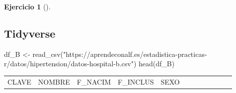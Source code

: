 \documentclass[
  a4paper,
]{scrreport}
\newenvironment{Shaded}{\begin{snugshade}}{\end{snugshade}}
\newcommand{\FunctionTok}[1]{\textcolor[rgb]{0.28,0.35,0.67}{#1}}
\newcommand{\NormalTok}[1]{\textcolor[rgb]{0.00,0.23,0.31}{#1}}
\newcommand{\OtherTok}[1]{\textcolor[rgb]{0.00,0.23,0.31}{#1}}
\newcommand{\StringTok}[1]{\textcolor[rgb]{0.13,0.47,0.30}{#1}}
\theoremstyle{definition}
\newtheorem{exercise}{Ejercicio}[chapter]
\theoremstyle{remark}
\begin{document}
\begin{exercise}[]
\begin{enumerate}
\begin{tcolorbox}
  \section{Tidyverse}

\begin{Shaded}
\begin{Highlighting}[]
\NormalTok{df\_B }\OtherTok{\textless{}{-}} \FunctionTok{read\_csv}\NormalTok{(}\StringTok{"https://aprendeconalf.es/estadistica{-}practicas{-}r/datos/hipertension/datos{-}hospital{-}b.csv"}\NormalTok{)}
\FunctionTok{head}\NormalTok{(df\_B)}
\end{Highlighting}
\end{Shaded}

  \begin{longtable}[]{@{}
    >{\raggedleft\arraybackslash}p{}
    >{\raggedright\arraybackslash}p{}
    >{\raggedright\arraybackslash}p{}
    >{\raggedright\arraybackslash}p{}
    >{\raggedleft\arraybackslash}p{}
    >{\raggedleft\arraybackslash}p{}
    >{\raggedleft\arraybackslash}p{}
    >{\raggedleft\arraybackslash}p{}
    >{\raggedleft\arraybackslash}p{}
    >{\raggedleft\arraybackslash}p{}
    >{\raggedleft\arraybackslash}p{}
    >{\raggedleft\arraybackslash}p{}@{}}
  \toprule\noalign{}
  \begin{minipage}[b]{\linewidth}\raggedleft
  CLAVE
  \end{minipage} & \begin{minipage}[b]{\linewidth}\raggedright
  NOMBRE
  \end{minipage} & \begin{minipage}[b]{\linewidth}\raggedright
  F\_NACIM
  \end{minipage} & \begin{minipage}[b]{\linewidth}\raggedright
  F\_INCLUS
  \end{minipage} & \begin{minipage}[b]{\linewidth}\raggedleft
  SEXO
  \end{minipage} & \begin{minipage}[b]{\linewidth}\raggedleft

\end{minipage}
\end{longtable}
\end{tcolorbox}
\end{enumerate}
\end{exercise}
\end{document}
